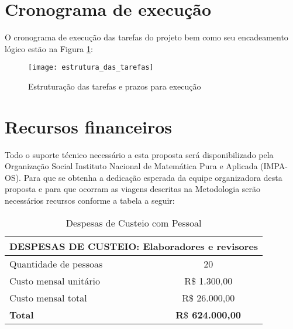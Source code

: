 \documentclass[10 pt]{article}
\begin{document}
\section{Cronograma de execução}\label{cronograma}

O cronograma de execução das tarefas do projeto bem como seu encadeamento lógico estão na Figura \ref{tarefas}:

\begin{landscape}
\begin{figure}[ht]
 \texttt{[image: estrutura\_das\_tarefas]}
 \caption{Estruturação das tarefas e prazos para execução} \label{tarefas}
\end{figure}
\end{landscape}

\section{Recursos financeiros}

Todo o suporte técnico necessário a esta proposta será disponibilizado pela Organização Social Instituto Nacional de Matemática Pura e Aplicada (IMPA-OS). Para que se obtenha a dedicação esperada da equipe organizadora desta proposta e para que ocorram as viagens descritas na Metodologia serão necessários recursos conforme a tabela a seguir:

\begin{table}[h] \label{tab pessoal}
  \begin{center}
\begin{tabular}[h!]{|l|c|}
   \hline
\multicolumn{2}{|c|}{{\bf DESPESAS DE CUSTEIO: Elaboradores e revisores}} \\
   \hline
   Quantidade de pessoas & 20\\
   \hline
   Custo mensal unitário & R$\$$ 1.300,00\\
   \hline
    Custo mensal total & R$\$$ 26.000,00\\
   \hline
   {\bf Total} & {\bf R$\$$ 624.000,00} \\
   \hline
\end{tabular}
  \end{center}
  \caption{Despesas de Custeio com Pessoal}
 \end{table}
\end{document}
